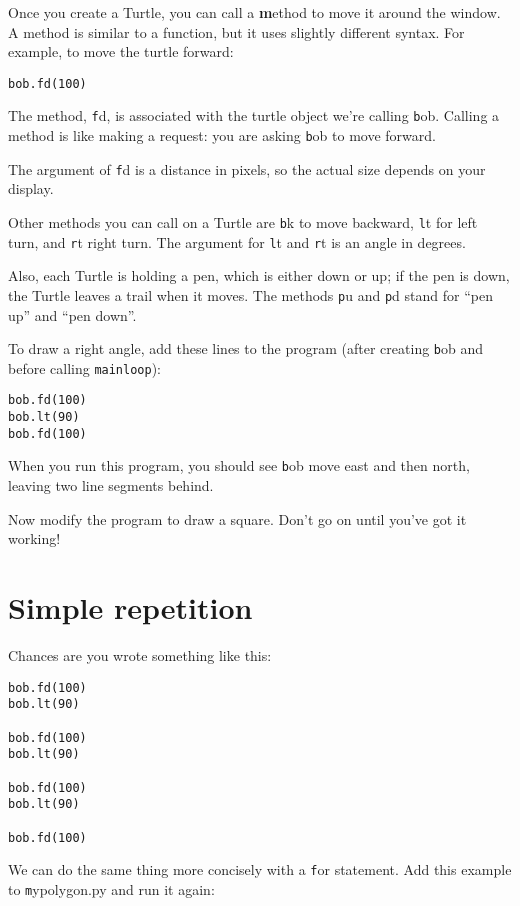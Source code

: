 \documentclass[
DIV=11,
fontsize=12,
twoside,
headinclude=false,
titlepage=firstiscover,
abstract=true,
headsepline=true,
footsepline=true,
chapterprefix=true, %
headings=big,
bibliography=totoc,%
captions=tableheading
]{scrbook}
\theoremstyle{definition}
\begin{document}
Once you create a Turtle, you can call a {\textbf method} to move it
around the window.  A method is similar to a function, but it
uses slightly different syntax.  For example, to move the turtle
forward:

\begin{lstlisting}
bob.fd(100)
\end{lstlisting}
%
The method, {\texttt fd}, is associated with the turtle
object we're calling {\texttt bob}.  
Calling a method is like making a request: you are asking {\texttt bob}
to move forward.

The argument of {\texttt fd} is a distance in pixels, so the actual
size depends on your display.

Other methods you can call on a Turtle are {\texttt bk} to move
backward, {\texttt lt} for left turn, and {\texttt rt} right turn.  The
argument for {\texttt lt} and {\texttt rt} is an angle in degrees.

Also, each Turtle is holding a pen, which is
either down or up; if the pen is down, the Turtle leaves
a trail when it moves.  The methods {\texttt pu} and {\texttt pd}
stand for ``pen up'' and ``pen down''.

To draw a right angle, add these lines to the program
(after creating {\texttt bob} and before calling \verb"mainloop"):

\begin{lstlisting}
bob.fd(100)
bob.lt(90)
bob.fd(100)
\end{lstlisting}
%
When you run this program, you should see {\texttt bob} move east and then
north, leaving two line segments behind.

Now modify the program to draw a square.  Don't go on until
you've got it working!


\section{Simple repetition}
\label{repetition}

Chances are you wrote something like this:

\begin{lstlisting}
bob.fd(100)
bob.lt(90)

bob.fd(100)
bob.lt(90)

bob.fd(100)
bob.lt(90)

bob.fd(100)
\end{lstlisting}
%
We can do the same thing more concisely with a {\texttt for} statement.
Add this example to {\texttt mypolygon.py} and run it again:
\end{document}
